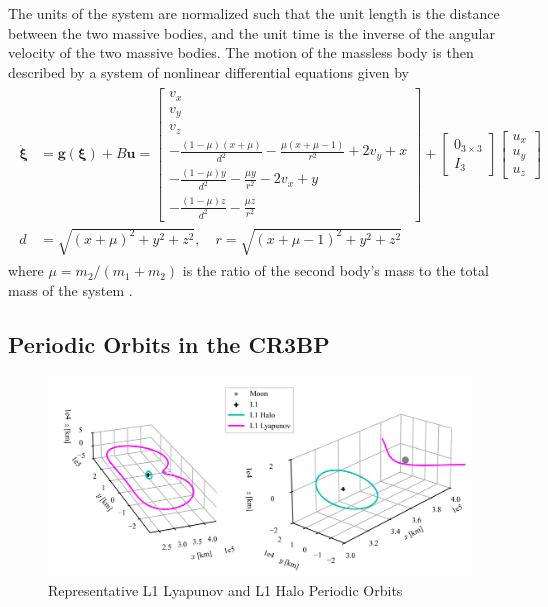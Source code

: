 \documentclass[letterpaper, preprint, paper,11pt]{AAS}	%
\begin{document}
The units of the system are normalized such that the unit length is the distance between the two massive bodies, and the unit time is the inverse of the angular velocity of the two massive bodies. The motion of the massless body is then described by a system of nonlinear differential equations given by 
\begin{align}
\begin{aligned}
    \dot{\bm{\xi}} &= \bm{g}(\bm{\xi}) + B\bm{u}= \begin{bmatrix}
        v_x \\
        v_y \\
        v_z \\
        -\frac{(1 - \mu)(x + \mu)}{d^2} - \frac{\mu(x + \mu - 1)}{r^2} + 2v_y + x\\
        -\frac{(1 - \mu)y}{d^2} - \frac{\mu y}{r^2} - 2v_x + y\\
        -\frac{(1 - \mu)z}{d^2} - \frac{\mu z}{r^2}
    \end{bmatrix} + \begin{bmatrix}
        0_{3 \times 3} \\
        I_3
    \end{bmatrix} \begin{bmatrix}
        u_x \\
        u_y \\
        u_z
    \end{bmatrix} \\
    d &= \sqrt{(x+\mu)^2 + y^2 + z^2}, \quad r = \sqrt{(x + \mu - 1)^2 + y^2 + z^2} \label{eq:CR3BP-dynamics}
\end{aligned}
\end{align}
\noindent where $\mu = m_2/(m_1 + m_2)$ is the ratio of the second body's mass to the total mass of the system \cite{zimovan2017characteristics}.

\subsection{Periodic Orbits in the CR3BP}

\begin{figure}
    \centering
    \includegraphics[width=0.85\linewidth]{Figures/orbits.png}
    \caption{Representative L1 Lyapunov and L1 Halo Periodic Orbits}
    \label{fig:orbits}
\end{figure}
\end{document}
